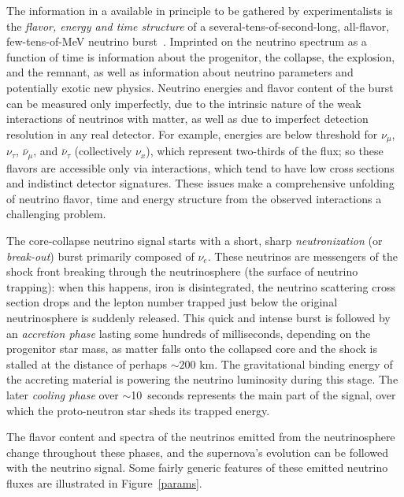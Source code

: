 The information in a  available in principle
to be gathered by experimentalists is the \textit{flavor, energy and
  time structure} of a several-tens-of-second-long, all-flavor,
few-tens-of-MeV neutrino burst~\cite{Mirizzi:2015eza, Horiuchi:2017sku}.  Imprinted on
the neutrino spectrum as a function of time is information about the
progenitor, the collapse, the explosion, and the remnant, as well as
information about neutrino parameters and potentially exotic new
physics.  Neutrino energies and flavor content of the burst can be
measured only imperfectly, due to the intrinsic nature of the weak
interactions of neutrinos with matter, as well as due to imperfect
detection resolution in any real detector.  For example,  
 energies are below  threshold for $\nu_\mu$,
$\nu_\tau$, $\bar{\nu}_\mu$, and $\bar{\nu}_{\tau}$ (collectively
$\nu_x$), which represent two-thirds of the flux; so these flavors are
accessible only via   interactions, which tend to have
low cross sections and indistinct detector signatures. 
These issues make a
comprehensive unfolding of neutrino flavor, time and energy structure
from the observed interactions a challenging problem.

The core-collapse neutrino signal starts with a short, sharp
\emph{neutronization} (or \emph{break-out}) burst primarily composed of
$\nu_e$. These neutrinos are messengers of the shock front breaking through the neutrinosphere (the surface of neutrino trapping): when this happens, iron is disintegrated, the neutrino scattering cross section drops and the lepton number trapped just below the original neutrinosphere is suddenly released. This quick and intense burst is followed by an
\emph{accretion phase} lasting some hundreds of milliseconds, depending on the progenitor star mass, as matter falls onto the collapsed core and the shock is stalled at the distance of perhaps $\sim 200$ km. The gravitational binding energy of the accreting material is powering the neutrino luminosity during this stage. The later
\emph{cooling phase} over $\sim$10~seconds represents the main part of
the signal, over which the proto-neutron star sheds its trapped energy.  

The flavor content and spectra of the neutrinos emitted from the neutrinosphere change
throughout these phases, and the supernova's evolution can
be followed with the neutrino signal. 
Some fairly generic features of these emitted neutrino fluxes are
illustrated in Figure~\ref{params}.

